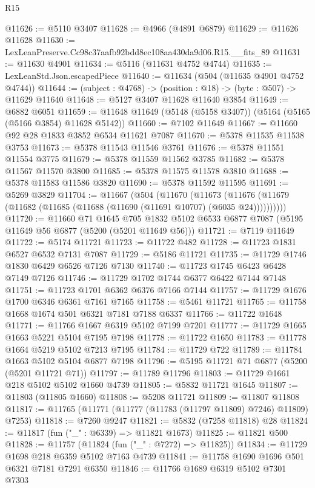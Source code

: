 \begin{lexlean}{R15}
\begin{coremodule}
{{{{{{{{{{{@11626 := @5110 @3407
@11628 := @4966 (@4891 @6879)
@11629 := @11626 @11628
@11630 := LexLeanPreserve.Cc98c37aafb92bdd8ec108aa430da9d06.R15.__fits_89
@11631 := @11630 @4901
@11634 := @5116 (@11631 @4752 @4744)
@11635 := LexLeanStd.Json.escapedPiece
@11640 := @11634 (@504 (@11635 @4901 @4752 @4744))
@11644 := (subject : @4768) -> (position : @18) -> (byte : @507) -> @11629 @11640
@11648 := @5127 @3407 @11628 @11640 @3854
@11649 := @6882 @6051
@11659 := @11648 @11649 (@5148 (@5158 @3407)) (@5164 (@5165 (@5166 @3854) @11628 @5142))
@11660 := @7102 @11649
@11667 := @11660 @92 @28 @1833 @3852 @6534 @11621 @7087
@11670 := @5378 @11535 @11538 @3753
@11673 := @5378 @11543 @11546 @3761
@11676 := @5378 @11551 @11554 @3775
@11679 := @5378 @11559 @11562 @3785
@11682 := @5378 @11567 @11570 @3800
@11685 := @5378 @11575 @11578 @3810
@11688 := @5378 @11583 @11586 @3820
@11690 := @5378 @11592 @11595
@11691 := @5269 @3829
@11704 := @11667
    (@504
      (@11670
        (@11673 (@11676 (@11679 (@11682 (@11685 (@11688 (@11690 (@11691 @10707) (@6035 @24))))))))))
@11720 := @11660
    @71
    @1645
    @705
    @1832
    @5102
    @6533
    @6877
    @7087
    (@5195 @11649 @56 @6877 (@5200 (@5201 @11649 @56)))
@11721 := @7119 @11649
@11722 := @5174 @11721
@11723 := @11722 @482
@11728 := @11723 @1831 @6527 @6532 @7131 @7087
@11729 := @5186 @11721
@11735 := @11729 @1746 @1830 @6429 @6526 @7126 @7130
@11740 := @11723 @1745 @6423 @6428 @7149 @7126
@11746 := @11729 @1702 @1744 @6377 @6422 @7144 @7148
@11751 := @11723 @1701 @6362 @6376 @7166 @7144
@11757 := @11729 @1676 @1700 @6346 @6361 @7161 @7165
@11758 := @5461 @11721
@11765 := @11758 @1668 @1674 @501 @6321 @7181 @7188 @6337
@11766 := @11722 @1648
@11771 := @11766 @1667 @6319 @5102 @7199 @7201
@11777 := @11729 @1665 @1663 @5221 @5104 @7195 @7198
@11778 := @11722 @1650
@11783 := @11778 @1664 @5219 @5102 @7213 @7195
@11784 := @11729 @722
@11789 := @11784 @1663 @5102 @5104 @6877 @7198
@11796 := @5195 @11721 @71 @6877 (@5200 (@5201 @11721 @71))
@11797 := @11789 @11796
@11803 := @11729 @1661 @218 @5102 @5102 @1660 @4739
@11805 := @5832 @11721 @1645
@11807 := @11803 (@11805 @1660)
@11808 := @5208 @11721
@11809 := @11807 @11808
@11817 := @11765 (@11771 (@11777 (@11783 (@11797 @11809) @7246) @11809) @7253)
@11818 := @7260 @9247
@11821 := @5832 (@7258 @11818) @28
@11824 := @11817 (fun ("_" : @6339) => @11821 @1673)
@11825 := @11821 @500
@11828 := @11757 (@11824 (fun ("_" : @7272) => @11825))
@11834 := @11729 @1698 @218 @6359 @5102 @7163 @4739
@11841 := @11758 @1690 @1696 @501 @6321 @7181 @7291 @6350
@11846 := @11766 @1689 @6319 @5102 @7301 @7303
}}}}}}}}}}}
\end{coremodule}
\end{lexlean}
